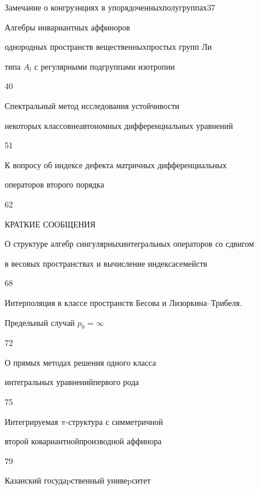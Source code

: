 

{Замечание о конгруэнциях в упорядоченных\newline полугруппах}{37}




{Алгебры инвариантных аффиноров


однородных пространств вещественных\newline простых групп Ли


типа $A_l$ с регулярными подгруппами изотропии}{40}




{Спектральный метод исследования устойчивости  


некоторых классов\newline неавтономных дифференциальных уравнений}{51}




{К вопросу об индексе дефекта матричных дифференциальных 


\newline операторов второго порядка}{62}





\bigskip


\par


\centerline{КРАТКИЕ СООБЩЕНИЯ}


\bigskip







{О структуре алгебр сингулярных\newline интегральных операторов со сдвигом


в весовых пространствах и вычисление индекса\newline семейств}{68}




{Интерполяция в классе пространств Бесова и Лизоркина--Трибеля.\newline


Предельный случай $p_0=\infty$}{72}




{О прямых методах решения одного класса


интегральных уравнений\newline первого рода}{75}




{Интегрируемая $\pi$-структура с симметричной  


второй ковариантной\newline производной аффинора}{79}








\vfill


\noindent\raisebox{2pt}{\copyright} Казанский госудаpственный унивеpситет





